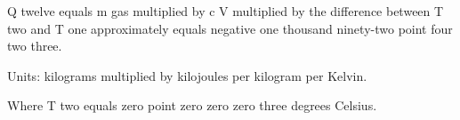 Q twelve equals m gas multiplied by c V multiplied by the difference between T two and T one approximately equals negative one thousand ninety-two point four two three.  

Units: kilograms multiplied by kilojoules per kilogram per Kelvin.  

Where T two equals zero point zero zero zero three degrees Celsius.